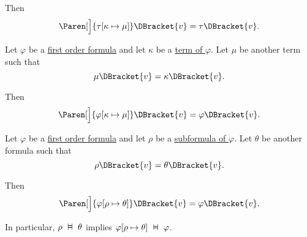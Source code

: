 \begin{proposition}
\begin{PropEnum}
    Then
    \begin{equation}\label{eq:thm:first_order_substitution_equivalence/term_in_term}
      \Paren[\Big]{ \tau[\kappa \mapsto \mu] }\DBracket{v} = \tau\DBracket{v}.
    \end{equation}

     Let \( \varphi \) be a \hyperref[def:first_order_syntax/formula]{first order formula} and let \( \kappa \) be a \hyperref[def:first_order_syntax/formula_terms]{term of \( \varphi \)}. Let \( \mu \) be another term such that
    \begin{equation}\label{eq:thm:first_order_substitution_equivalence/term_in_formula/compatibility}
      \mu\DBracket{v} = \kappa\DBracket{v}.
    \end{equation}

    Then
    \begin{equation}\label{eq:thm:first_order_substitution_equivalence/term_in_formula}
      \Paren[\Big]{ \varphi[\kappa \mapsto \mu] }\DBracket{v} = \varphi\DBracket{v}.
    \end{equation}

     Let \( \varphi \) be a \hyperref[def:first_order_syntax/formula]{first order formula} and let \( \rho \) be a \hyperref[def:first_order_syntax/subformula]{subformula of \( \varphi \)}. Let \( \theta \) be another formula such that
    \begin{equation}\label{eq:thm:first_order_substitution_equivalence/formula_in_formula/compatibility}
      \rho\DBracket{v} = \theta\DBracket{v}.
    \end{equation}

    Then
    \begin{equation}\label{eq:thm:first_order_substitution_equivalence/formula_in_formula}
      \Paren[\Big]{ \varphi[\rho \mapsto \theta] }\DBracket{v} = \varphi\DBracket{v}.
    \end{equation}

    In particular, \( \rho \Sequiv \theta \) implies \( \varphi[\rho \mapsto \theta] \Sequiv \varphi \).
  \end{PropEnum}
\end{proposition}
